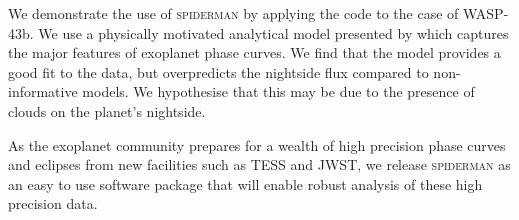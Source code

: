\documentclass[a4paper,fleqn,usenatbib]{mnras}
\begin{document}
We demonstrate the use of \textsc{spiderman} by applying the code to the case of WASP-43b. We use a physically motivated analytical model presented by \citet{Zhang2016} which captures the major features of exoplanet phase curves. We find that the model provides a good fit to the data, but overpredicts the nightside flux compared to non-informative models. We hypothesise that this may be due to the presence of clouds on the planet's nightside.

As the exoplanet community prepares for a wealth of high precision phase curves and eclipses from new facilities such as TESS and JWST, we release \textsc{spiderman} as an easy to use software package that will enable robust analysis of these high precision data.




\end{document}
